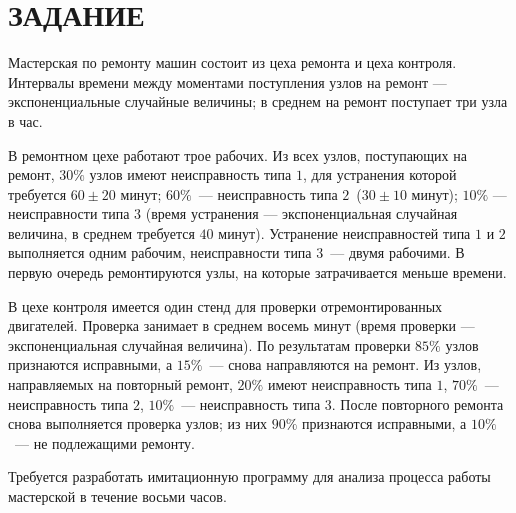 \section*{ЗАДАНИЕ}

Мастерская по ремонту машин состоит из цеха ремонта и цеха контроля. Интервалы
времени между моментами поступления узлов на ремонт --- экспоненциальные случайные
величины; в среднем на ремонт поступает три узла в час.

В ремонтном цехе работают трое рабочих. Из всех узлов, поступающих на ремонт,
$ 30\% $ узлов имеют неисправность типа $1$, для устранения которой требуется
$ 60 \pm 20$ минут; $ 60\% $~--- неисправность типа $2$~($ 30 \pm 10 $ минут);
$ 10\% $ --- неисправности типа $3$ (время устранения --- экспоненциальная случайная
величина, в среднем требуется $40$ минут). Устранение неисправностей типа $1$ и $2$
выполняется одним рабочим, неисправности типа $3$~--- двумя рабочими. В первую
очередь ремонтируются узлы, на которые затрачивается меньше времени.

В цехе контроля имеется один стенд для проверки отремонтированных двигателей.
Проверка занимает в среднем восемь минут (время проверки --- экспоненциальная
случайная величина). По результатам проверки $85\%$ узлов признаются исправными,
а $15\%$~--- снова направляются на ремонт. Из узлов, направляемых на повторный
ремонт, $20\%$ имеют неисправность типа $1$, $70\%$~--- неисправность типа $2$,
$10\%$~--- неисправность типа 3. После повторного ремонта снова выполняется
проверка узлов; из них $90\%$ признаются исправными, а $10\%$~--- не подлежащими
ремонту.

Требуется разработать имитационную программу для анализа процесса работы мастерской
в течение восьми часов.

\pagebreak
